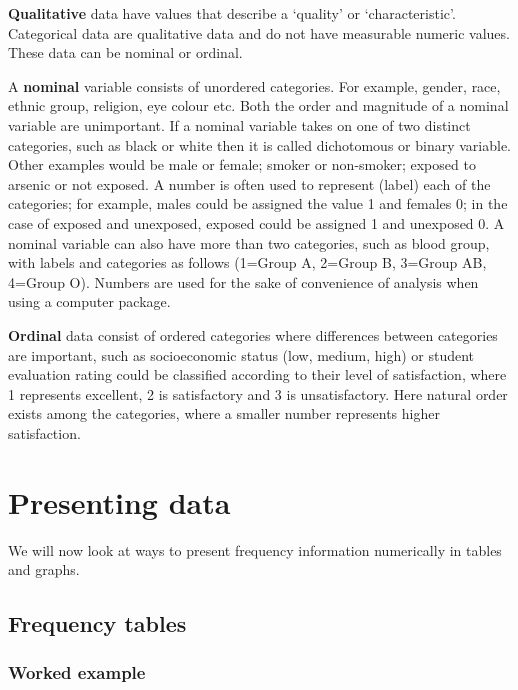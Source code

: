 \documentclass[
]{memoir}
\begin{document}
\textbf{Qualitative} data have values that describe a `quality' or `characteristic'. Categorical data are qualitative data and do not have measurable numeric values. These data can be nominal or ordinal.

A \textbf{nominal} variable consists of unordered categories. For example, gender, race, ethnic group, religion, eye colour etc. Both the order and magnitude of a nominal variable are unimportant. If a nominal variable takes on one of two distinct categories, such as black or white then it is called dichotomous or binary variable. Other examples would be male or female; smoker or non-smoker; exposed to arsenic or not exposed. A number is often used to represent (label) each of the categories; for example, males could be assigned the value 1 and females 0; in the case of exposed and unexposed, exposed could be assigned 1 and unexposed 0. A nominal variable can also have more than two categories, such as blood group, with labels and categories as follows (1=Group A, 2=Group B, 3=Group AB, 4=Group O). Numbers are used for the sake of convenience of analysis when using a computer package.

\textbf{Ordinal} data consist of ordered categories where differences between categories are important, such as socioeconomic status (low, medium, high) or student evaluation rating could be classified according to their level of satisfaction, where 1 represents excellent, 2 is satisfactory and 3 is unsatisfactory. Here natural order exists among the categories, where a smaller number represents higher satisfaction.

\hypertarget{presenting-data}{%
\section{Presenting data}\label{presenting-data}}

We will now look at ways to present frequency information numerically in tables and graphs.

\hypertarget{frequency-tables}{%
\subsection{Frequency tables}\label{frequency-tables}}

\hypertarget{worked-example}{%
\subsubsection{Worked example}\label{worked-example}}
\end{document}

